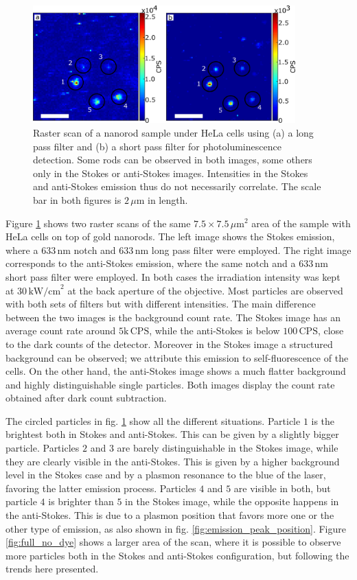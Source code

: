 \documentclass[journal=nalefd,manuscript=letter]{achemso}
\newcommand{\nm}{\ensuremath{\,\textrm{nm}}}
\newcommand{\um}{\ensuremath{\,\mu\textrm{m}}}
\newcommand{\pwr}{\ensuremath{\,\textrm{kW/cm}^2}}
\newcommand{\CPS}{\ensuremath{\,\textrm{CPS}}}
\begin{document}
\begin{figure}[htp] \centering
\includegraphics[width=0.9\textwidth]{Figures/04_Stokes_AS/stokes_as_no_dye.png}
\caption{Raster scan of a nanorod sample under HeLa cells using (a) a long pass
filter and (b) a short pass filter for photoluminescence detection.
Some rods can be observed in both images, some others only in the Stokes or
anti-Stokes images. Intensities in the Stokes and anti-Stokes emission thus do
not necessarily correlate. The scale bar in both figures is $2\um$ in length.}
	\label{fig:stokes_as_no_dye}
\end{figure}

Figure \ref{fig:stokes_as_no_dye} shows two raster scans of the same
$7.5\times7.5\um^2$ area of the sample with HeLa cells on top of gold nanorods.
The left image shows the Stokes emission, where a $633\nm$ notch and $633\nm$
long pass filter were employed. The right image corresponds to the anti-Stokes
emission, where the same notch and a $633\nm$ short pass filter were employed.
In both cases the irradiation intensity was kept at $30\pwr$ at the back
aperture of the objective. Most particles are observed with both sets of filters
but with different intensities. The main difference between the two images is
the background count rate. The Stokes image has an average count rate around
$5\textrm{k}\CPS$, while the anti-Stokes is below $100\CPS$, close to the dark
counts of the detector. Moreover in the Stokes image a structured background can
be observed; we attribute this emission to self-fluorescence of the cells. On
the other hand, the anti-Stokes image shows a much flatter background and highly
distinguishable single particles. Both images display the count rate
obtained after dark count subtraction.

The circled particles in fig. \ref{fig:stokes_as_no_dye} show all the different
situations. Particle $1$ is the brightest both in Stokes and anti-Stokes. This
can be given by a slightly bigger particle. Particles $2$ and $3$ are barely
distinguishable in the Stokes image, while they are clearly visible in the
anti-Stokes. This is given by a higher background level in the Stokes case and
by a plasmon resonance to the blue of the laser, favoring the latter emission
process. Particles $4$ and $5$ are visible in both, but particle $4$ is brighter
than $5$ in the Stokes image, while the opposite happens in the anti-Stokes.
This is due to a plasmon position that favors more one or the other type of
emission, as also shown in fig. \ref{fig:emission_peak_position}. Figure
\ref{fig:full_no_dye} shows a larger area of the scan, where it is possible to
observe more particles both in the Stokes and anti-Stokes configuration, but
following the trends here presented.
\end{document}

